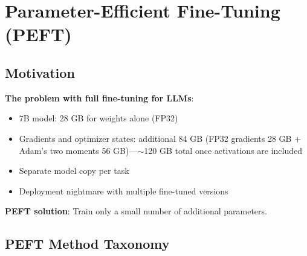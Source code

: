 \section{Parameter-Efficient Fine-Tuning (PEFT)}
\label{sec:peft}

\subsection{Motivation}

\textbf{The problem with full fine-tuning for LLMs}:
\begin{itemize}
    \item 7B model: 28 GB for weights alone (FP32)
    \item Gradients and optimizer states: additional 84 GB (FP32 gradients 28 GB + Adam's two moments 56 GB)---$\sim$120 GB total once activations are included
    \item Separate model copy per task
    \item Deployment nightmare with multiple fine-tuned versions
\end{itemize}

\textbf{PEFT solution}: Train only a small number of additional parameters.

\subsection{PEFT Method Taxonomy}

